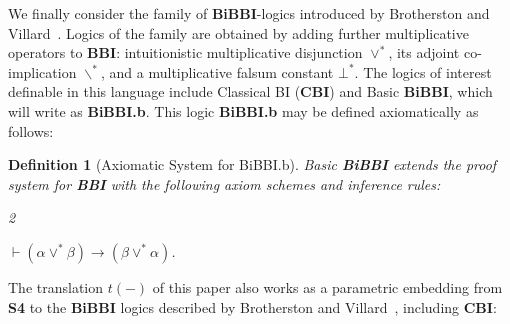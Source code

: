 \documentclass[a4paper]{article}
\newtheorem{definition}[theorem]{Definition}
\newcommand{\BBI}{\textbf{BBI}\xspace}
\newcommand{\SFour}{\textbf{S4}\xspace}
\begin{document}
We finally consider the family of \textbf{BiBBI}-logics introduced by Brotherston and Villard~\cite{intermediateBBI}. Logics of the family are obtained by adding further multiplicative operators to \BBI: intuitionistic multiplicative disjunction $\lor^*$, its adjoint co-implication $\backslash^*$, and a multiplicative falsum constant $\bot^*$.
The logics of interest definable in this language include Classical BI (\textbf{CBI}) and Basic \textbf{BiBBI}, which will write as \textbf{BiBBI.b}. This logic \textbf{BiBBI.b} may be defined axiomatically as follows:





\begin{definition}[Axiomatic System for BiBBI.b] Basic \textbf{BiBBI} extends the proof system for \BBI with the following axiom schemes and inference rules:
    \begin{enumerate}
\begin{multicols}{2}
\item[R1.] \AxiomC{$(\alpha \rightarrow \gamma)$}
\AxiomC{$(\beta \rightarrow \delta)$}

\RightLabel{[Mon.]}
\BinaryInfC{$( \alpha \lor^* \beta)\rightarrow (\gamma \lor^* \delta)$}

\DisplayProof
\item[R2.] \AxiomC{$\alpha \rightarrow (\beta \lor^* \gamma)$}
\RightLabel{[Residuation 1]}
\UnaryInfC{$(\alpha \backslash^* \beta)\rightarrow \gamma$}

\vspace{0.5em}
\DisplayProof

\item[R3.] \AxiomC{$(\alpha \backslash^* \beta)\rightarrow \gamma$}
\RightLabel{[Residuation 2]}
\UnaryInfC{$\alpha \rightarrow (\beta \lor^* \gamma)$}

\DisplayProof

\item[Ax.] \vspace{0.5em}$\vdash (\alpha \lor^* \beta) \rightarrow (\beta \lor ^* \alpha)$.
\end{multicols}
\end{enumerate}


\end{definition}

The translation $t(-)$ of this paper also works as a parametric embedding from \SFour to the \textbf{BiBBI} logics described by Brotherston and Villard~\cite{intermediateBBI}, including \textbf{CBI}:
\end{document}
